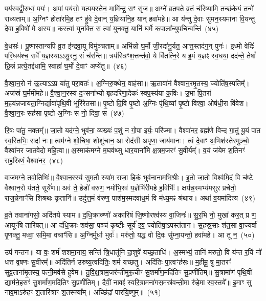 पय॑स्वद्वी॒रुधां॒ पयः॑। अ॒पां पय॑सो॒ यत्पय॒स्तेन॒ मामि॑न्द्र॒ सꣳ सृ॑ज॥ अग्ने᳚ व्रतपते व्र॒तं च॑रिष्यामि॒ तच्छ॑केयं॒ तन्मे॑ राध्यताम्॥ अ॒ग्निꣳ होता॑रमि॒ह तꣳ हु॑वे दे॒वान् य॒ज्ञिया॑नि॒ह यान् हवा॑महे॥ आ य॑न्तु दे॒वाः सु॑मन॒स्यमा॑ना वि॒यन्तु॑ दे॒वा ह॒विषो॑ मे अ॒स्य॥ कस्त्वा॑ युनक्ति॒ स त्वा॑ युनक्तु॒ यानि॑ घ॒र्मे क॒पाला᳚न्युपचि॒न्वन्ति॑~(४५)

वे॒धसः॑। पू॒ष्णस्तान्यपि॑ व्र॒त इ॑न्द्रवा॒यू विमु॑ञ्चताम्॥ अभि॑न्नो घ॒र्मो जी॒रदा॑नु॒र्यत॒ आत्त॒स्तद॑ग॒न् पुनः॑। इ॒ध्मो वेदिः॑ परि॒धय॑श्च॒ सर्वे॑ य॒ज्ञस्या\-ऽऽ\-यु॒रनु॒ सं च॑रन्ति॥ त्रय॑स्त्रिꣳश॒त्तन्त॑वो॒ ये वि॑तत्नि॒रे य इ॒मं य॒ज्ञꣴ स्व॒धया॒ दद॑न्ते॒ तेषां᳚ छि॒न्नं प्रत्ये॒तद्द॑धामि॒ स्वाहा॑ घ॒र्मो दे॒वाꣳ अप्ये॑तु॥~(४६)

{}%

वै॒श्वा॒न॒रो न॑ ऊ॒त्या\-ऽऽ\-प्र या॑तु परा॒वतः॑। अ॒ग्निरु॒क्थेन॒ वाह॑सा॥ ऋ॒तावा॑नं वैश्वान॒रमृ॒तस्य॒ ज्योति॑ष॒स्पतिम्᳚। अज॑स्रं घ॒र्ममी॑महे॥ वै॒श्वा॒न॒रस्य॑ द॒ꣳ॒सना᳚भ्यो बृ॒हदरि॑णा॒देकः॑ स्वप॒स्य॑या क॒विः। उ॒भा पि॒तरा॑ म॒हय॑न्नजायता॒ग्निर्द्यावा॑\-पृथि॒वी भूरि॑रेतसा॥ पृ॒ष्टो दि॒वि पृ॒ष्टो अ॒ग्निः पृ॑थि॒व्यां पृ॒ष्टो विश्वा॒ ओष॑धी॒रा वि॑वेश। वै॒श्वा॒न॒रः सह॑सा पृ॒ष्टो अ॒ग्निः स नो॒ दिवा॒ स~(४७)

रि॒षः पा॑तु॒ नक्तम्᳚॥ जा॒तो यद॑ग्ने॒ भुव॑ना॒ व्यख्यः॑ प॒शुं न गो॒पा इर्यः॒ परि॑ज्मा। वैश्वा॑नर॒ ब्रह्म॑णे विन्द गा॒तुं यू॒यं पा॑त स्व॒स्तिभिः॒ सदा॑ नः॥ त्वम॑ग्ने शो॒चिषा॒ शोशु॑चान॒ आ रोद॑सी अपृणा॒ जाय॑मानः। त्वं दे॒वाꣳ अ॒भिश॑स्तेरमुञ्चो॒ वैश्वा॑नर जातवेदो महि॒त्वा॥ अ॒स्माक॑मग्ने म॒घव॑थ्सु धार॒याना॑मि क्ष॒त्रम॒जरꣳ॑ सु॒वीर्यम्᳚। व॒यं ज॑येम श॒तिनꣳ॑ सह॒स्रिणं॒ वैश्वा॑नर॒~(४८)

वाज॑मग्ने॒ तवो॒तिभिः॑॥ वै॒श्वा॒न॒रस्य॑ सुम॒तौ स्या॑म॒ राजा॒ हिकं॒ भुव॑नानामभि॒श्रीः। इ॒तो जा॒तो विश्व॑मि॒दं वि च॑ष्टे वैश्वान॒रो य॑तते॒ सूर्ये॑ण॥ अव॑ ते॒ हेडो॑ वरुण॒ नमो॑\-भि॒रव॑ य॒ज्ञेभि॑रीमहे ह॒विर्भिः॑। क्षय॑न्न॒स्मभ्य॑मसुर प्रचेतो॒ राज॒न्नेनाꣳ॑सि शिश्रथः कृ॒तानि॑॥ उदु॑त्त॒मं व॑रुण॒ पाश॑\-म॒स्मद\-वा॑ध॒मं वि म॑ध्य॒मꣴ श्र॑थाय। अथा॑ व॒यमा॑दित्य~(४९)

व्र॒ते तवाना॑गसो॒ अदि॑तये स्याम॥ द॒धि॒क्राव्ण्णो॑ अकारिषं जि॒ष्णोरश्व॑स्य वा॒जिनः॑॥ सु॒र॒भि नो॒ मुखा॑ कर॒त् प्र ण॒ आयूꣳ॑षि तारिषत्॥ आ द॑धि॒क्राः शव॑सा॒ पञ्च॑ कृ॒ष्टीः सूर्य॑ इव॒ ज्योति॑षा॒\-ऽपस्त॑तान। स॒ह॒स्र॒साः श॑त॒सा वा॒ज्यर्वा॑ पृ॒णक्तु॒ मध्वा॒ समि॒मा वचाꣳ॑सि॥ अ॒ग्निर्मू॒र्धा भुवः॑। मरु॑तो॒ यद्ध॑ वो दि॒वः सु॑म्ना॒यन्तो॒ हवा॑महे। आ तू न॒~(५०)

उप॑ गन्तन॥ या वः॒ शर्म॑ शशमा॒नाय॒ सन्ति॑ त्रि॒धातू॑नि दा॒शुषे॑ यच्छ॒ताधि॑। अ॒स्मभ्यं॒ तानि॑ मरुतो॒ वि य॑न्त र॒यिं नो॑ धत्त वृषणः सु॒वीरम्᳚॥ अदि॑तिर्न उरुष्य॒त्वदि॑तिः॒ शर्म॑ यच्छतु। अदि॑तिः पा॒त्वꣳह॑सः॥ म॒हीमू॒ षु मा॒तरꣳ॑ सुव्र॒ता\-ना॑\-मृ॒तस्य॒ पत्नी॒मव॑से हुवेम। तु॒वि॒क्ष॒त्रा\-म॒जर॑न्ती\-मुरू॒चीꣳ सु॒शर्मा॑ण॒मदि॑तिꣳ सु॒प्रणी॑तिम्॥ सु॒त्रामा॑णं पृथि॒वीं द्याम॑ने॒हसꣳ॑ सु॒शर्मा॑ण॒मदि॑तिꣳ सु॒प्रणी॑तिम्। दैवीं॒ नावꣴ॑ स्वरि॒त्रा\-मना॑\-गस॒मस्र॑वन्ती॒मा रु॑हेमा स्व॒स्तये᳚॥ इ॒माꣳ सु नाव॒मा\-ऽरु॑हꣳ श॒तारि॑त्राꣳ श॒तस्फ्या᳚म्। अच्छि॑द्रां पारयि॒ष्णुम्॥~(५१)

